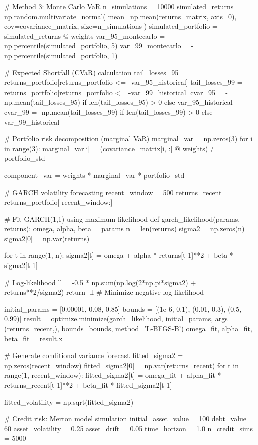 \documentclass[11pt,a4paper]{article}
\begin{document}
\begin{pycode}
# Method 3: Monte Carlo VaR
n_simulations = 10000
simulated_returns = np.random.multivariate_normal(
    mean=np.mean(returns_matrix, axis=0),
    cov=covariance_matrix,
    size=n_simulations
)
simulated_portfolio = simulated_returns @ weights
var_95_montecarlo = -np.percentile(simulated_portfolio, 5)
var_99_montecarlo = -np.percentile(simulated_portfolio, 1)

# Expected Shortfall (CVaR) calculation
tail_losses_95 = returns_portfolio[returns_portfolio <= -var_95_historical]
tail_losses_99 = returns_portfolio[returns_portfolio <= -var_99_historical]
cvar_95 = -np.mean(tail_losses_95) if len(tail_losses_95) > 0 else var_95_historical
cvar_99 = -np.mean(tail_losses_99) if len(tail_losses_99) > 0 else var_99_historical

# Portfolio risk decomposition (marginal VaR)
marginal_var = np.zeros(3)
for i in range(3):
    marginal_var[i] = (covariance_matrix[i, :] @ weights) / portfolio_std

component_var = weights * marginal_var * portfolio_std

# GARCH volatility forecasting
recent_window = 500
returns_recent = returns_portfolio[-recent_window:]

# Fit GARCH(1,1) using maximum likelihood
def garch_likelihood(params, returns):
    omega, alpha, beta = params
    n = len(returns)
    sigma2 = np.zeros(n)
    sigma2[0] = np.var(returns)

    for t in range(1, n):
        sigma2[t] = omega + alpha * returns[t-1]**2 + beta * sigma2[t-1]

    # Log-likelihood
    ll = -0.5 * np.sum(np.log(2*np.pi*sigma2) + returns**2/sigma2)
    return -ll  # Minimize negative log-likelihood

initial_params = [0.00001, 0.08, 0.85]
bounds = [(1e-6, 0.1), (0.01, 0.3), (0.5, 0.99)]
result = optimize.minimize(garch_likelihood, initial_params, args=(returns_recent,),
                          bounds=bounds, method='L-BFGS-B')
omega_fit, alpha_fit, beta_fit = result.x

# Generate conditional variance forecast
fitted_sigma2 = np.zeros(recent_window)
fitted_sigma2[0] = np.var(returns_recent)
for t in range(1, recent_window):
    fitted_sigma2[t] = omega_fit + alpha_fit * returns_recent[t-1]**2 + beta_fit * fitted_sigma2[t-1]

fitted_volatility = np.sqrt(fitted_sigma2)

# Credit risk: Merton model simulation
initial_asset_value = 100
debt_value = 60
asset_volatility = 0.25
asset_drift = 0.05
time_horizon = 1.0
n_credit_sims = 5000


\end{pycode}
\end{document}
